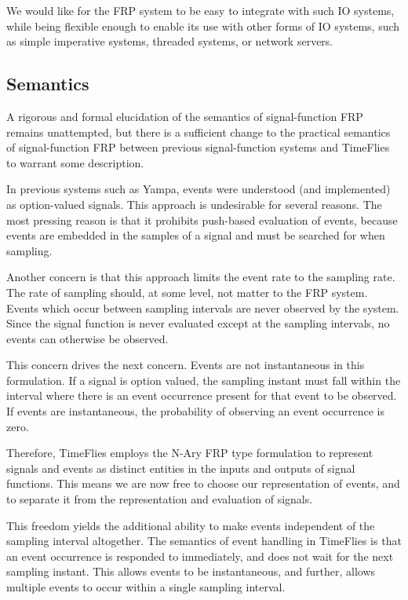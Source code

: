 \documentclass[draft]{llncs}
\begin{document}
We would like for the FRP system to be easy to integrate with such IO systems,
while being flexible enough to enable its use with other forms of IO systems,
such as simple imperative systems, threaded systems, or network servers.

\subsection{Semantics}
\label{subsection:System_Design_and_Interface-Semantics}

A rigorous and formal elucidation of the semantics of signal-function FRP remains
unattempted, but there is a sufficient change to the practical semantics of
signal-function FRP between previous signal-function systems and TimeFlies to warrant
some description.

In previous systems such as Yampa, events were understood (and implemented) as option-valued
signals. This approach is undesirable for several reasons. The most pressing reason is
that it prohibits push-based evaluation of events, because events are embedded in the
samples of a signal and must be searched for when sampling.

Another concern is that this approach limits the event rate to the sampling rate.
The rate of sampling should, at some level, not matter to the FRP system. Events
which occur between sampling intervals are never observed by the system. Since
the signal function is never evaluated except at the sampling intervals, no
events can otherwise be observed.

This concern drives the next concern. Events are not instantaneous in this formulation.
If a signal is option valued, the sampling instant must fall within the interval where
there is an event occurrence present for that event to be observed. If events are
instantaneous, the probability of observing an event occurrence is zero.

Therefore, TimeFlies employs the N-Ary FRP type formulation to represent signals and
events as distinct entities in the inputs and outputs of signal functions. This means
we are now free to choose our representation of events, and to separate it from the
representation and evaluation of signals.

This freedom yields the additional ability to make events independent of the sampling
interval altogether. The semantics of event handling in TimeFlies is that an event occurrence
is responded to immediately, and does not wait for the next sampling instant. This allows events
to be instantaneous, and further, allows multiple events to occur within a single sampling interval.
\end{document}

